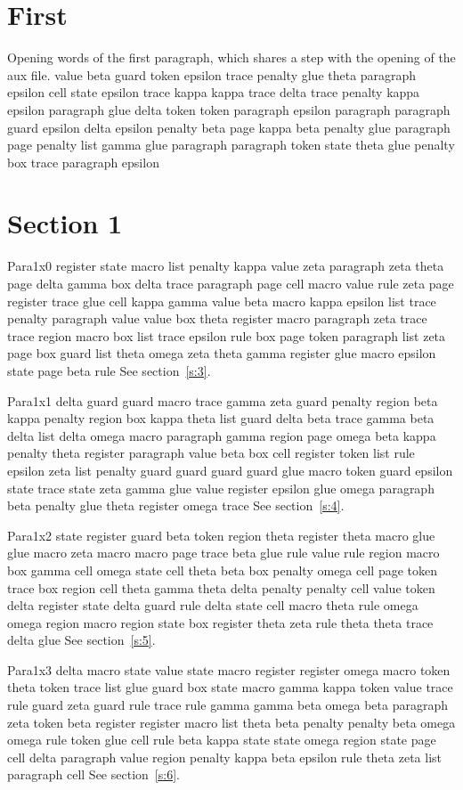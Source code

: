 \documentclass{article}
\begin{document}
\section{First}\label{s:0}
Opening words of the first paragraph, which shares a step with the opening of the aux file. value beta guard token epsilon trace penalty glue theta paragraph epsilon cell state epsilon trace kappa kappa trace delta trace penalty kappa epsilon paragraph glue delta token token paragraph epsilon paragraph paragraph guard epsilon delta epsilon penalty beta page kappa beta penalty glue paragraph page penalty list gamma glue paragraph paragraph token state theta glue penalty box trace paragraph epsilon

\section{Section 1}\label{s:1}
Para1x0 register state macro list penalty kappa value zeta paragraph zeta theta page delta gamma box delta trace paragraph page cell macro value rule zeta page register trace glue cell kappa gamma value beta macro kappa epsilon list trace penalty paragraph value value box theta register macro paragraph zeta trace trace region macro box list trace epsilon rule box page token paragraph list zeta page box guard list theta omega zeta theta gamma register glue macro epsilon state page beta rule See section~\ref{s:3}.

Para1x1 delta guard guard macro trace gamma zeta guard penalty region beta kappa penalty region box kappa theta list guard delta beta trace gamma beta delta list delta omega macro paragraph gamma region page omega beta kappa penalty theta register paragraph value beta box cell register token list rule epsilon zeta list penalty guard guard guard guard glue macro token guard epsilon state trace state zeta gamma glue value register epsilon glue omega paragraph beta penalty glue theta register omega trace See section~\ref{s:4}.

Para1x2 state register guard beta token region theta register theta macro glue glue macro zeta macro macro page trace beta glue rule value rule region macro box gamma cell omega state cell theta beta box penalty omega cell page token trace box region cell theta gamma theta delta penalty penalty cell value token delta register state delta guard rule delta state cell macro theta rule omega omega region macro region state box register theta zeta rule theta theta trace delta glue See section~\ref{s:5}.

Para1x3 delta macro state value state macro register register omega macro token theta token trace list glue guard box state macro gamma kappa token value trace rule guard zeta guard rule trace rule gamma gamma beta omega beta paragraph zeta token beta register register macro list theta beta penalty penalty beta omega omega rule token glue cell rule beta kappa state state omega region state page cell delta paragraph value region penalty kappa beta epsilon rule theta zeta list paragraph cell See section~\ref{s:6}.
\end{document}
